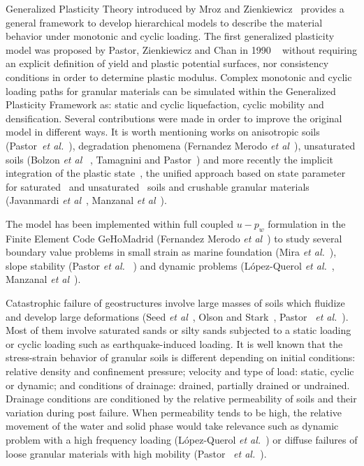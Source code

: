\documentclass[preprint,12pt,a4paper]{elsarticle}
\begin{document}
Generalized Plasticity Theory introduced by Mroz and Zienkiewicz~\cite{Mroz_Zk84} provides a general framework to develop hierarchical models to describe the material behavior under monotonic and cyclic loading. The first generalized plasticity model was proposed by Pastor, Zienkiewicz and Chan in 1990 ~\cite{PastorZC:90} without requiring an explicit definition of yield and plastic potential surfaces, nor consistency conditions in order to determine plastic modulus. Complex monotonic and cyclic loading paths for granular materials can be simulated within the Generalized Plasticity Framework as: static and cyclic liquefaction, cyclic mobility and densification. Several contributions were made in order to improve the original model in different ways. It is worth mentioning works on anisotropic soils (Pastor~\textit{et al.}~\cite{Pastor92}), degradation phenomena (Fernandez Merodo \textit{et al}~\cite{FernandezMerodo2004}), unsaturated soils (Bolzon \textit{et al }~\cite{Bolzon96}, Tamagnini and Pastor~\cite{Tamagnini04}) and more recently the implicit integration of the plastic state~\cite{Mira2009}, the unified approach based on state parameter for saturated~\cite{Manzanal2011} and unsaturated~\cite{Manzanal2011a} soils and crushable granular materials (Javanmardi \textit{et al}~\cite{Javanmardi2018}, Manzanal \textit{et al}~\cite{Manzanal2015, Manzanal2019}).

The model has been implemented within  full coupled  $u-p_w$ formulation in the Finite Element Code GeHoMadrid (Fernandez Merodo \textit{et al}~\cite{FernandezMerodo2004}) to study several boundary value problems in small strain as marine foundation (Mira \textit{et al.}~\cite{Mira18}), slope stability (Pastor \textit{et al. }~\cite{Pastor09,Pastor11}) and dynamic problems (L\'opez-Querol \textit{et al.}~\cite{LopezQuerol2008}, Manzanal \textit{et al}~\cite{Manzanal2019b}). 

Catastrophic failure of geostructures involve large masses of soils which fluidize and develop large deformations (Seed \textit{et al}~\cite{Seed75}, Olson and Stark~\cite{Olson02}, Pastor~\textit{ et al.}~\cite{Pastor09}). Most of them involve saturated sands or silty sands subjected to a static loading or cyclic loading such as earthquake-induced loading. It is well known that the stress-strain behavior of granular soils is different depending on initial conditions: relative density and confinement pressure; velocity and type of load: static, cyclic or dynamic; and conditions of drainage: drained, partially drained or undrained. Drainage conditions are conditioned by the relative permeability of soils and their variation during post failure. When permeability tends to be high, the relative movement of the water and solid phase would take relevance such as dynamic problem with a high frequency loading (L\'opez-Querol \textit{et al.}~\cite{LopezQuerol2006}) or diffuse failures of loose granular materials with high mobility (Pastor~\textit{ et al.}~\cite{Pastor09}). 
\end{document}
